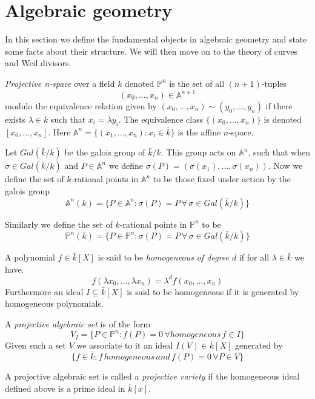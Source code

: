 
\section{Algebraic geometry}
In this section we define the fundamental objects in algebraic geometry and state
some facts about their structure. We will then move on to the theory of
curves and Weil divisors.

\begin{mydef}
\emph{Projective n-space} over a field $k$ denoted $\mathbb{P}^n$ is the set 
of all $(n+1)$-tuples $$(x_0,\ldots,x_n)\in\mathbb{A}^{n+1}$$
modulo the equivalence relation given by $(x_0,\ldots,x_n)\sim(y_0,\ldots,y_n)$ 
if there exists $\lambda\in k$ such that $x_i=\lambda y_i$.
The equivalence class $\{(x_0,\ldots,x_n)\}$ is denoted $[x_0,\ldots,x_n]$.
Here $\mathbb{A}^n = \{ (x_1,\ldots,x_n) : x_i \in \bar{k} \} $ is the affine $n$-space.
\end{mydef}

Let $Gal(\bar{k}/k)$ be the galois group of $\bar{k}/k$. This group acts on
$\mathbb{A}^n$, such that when $\sigma \in Gal(\bar{k}/k)$ and $P\in \mathbb{A}^n$
we define $\sigma(P) = (\sigma(x_1),\ldots,\sigma(x_n))$. Now we define
the set of $k$-rational points in $\mathbb{A}^n$ to be those fixed under action by
the galois group
$$ \mathbb{A}^n(k) = \{ P \in \mathbb{A}^n : \sigma(P) = P\, \forall\, \sigma \in
Gal(\bar{k}/k) \} $$

Similarly we define the set of $k$-rational points in $\mathbb{P}^n$ to be
$$ \mathbb{P}^n(k) = \{ P \in \mathbb{P}^n : \sigma(P) = P\, \forall\, \sigma \in 
Gal(\bar{k}/k) \} $$

\begin{mydef}
 A polynomial $f\in\bar{k}[X]$ is said to be \emph{homogeneous of degree $d$} if for all
$\lambda\in\bar{k}$ we have.
$$f(\lambda x_0,\ldots,\lambda x_n) = \lambda^d f(x_0,\ldots,x_n)$$
Furthermore an ideal $I\subseteq\bar{k}[X]$ is said to be homogeneous if it is generated
by homogeneous polynomials.
\end{mydef}

\begin{mydef}
 A \emph{projective algebraic set} is of the form
$$ V_I = \{ P\in \mathbb{P}^n : f(P) = 0\, \forall homogeneous\, f\in I \} $$
Given such a set $V$ we associate to it an ideal $I(V) \in \bar{k}[X]$ generated by
$$ \{f\in\bar{k} : f\, homogeneous\, and\, f(P)=0\, \forall P\in V \} $$
\end{mydef}

\begin{mydef}
 A projective algebraic set is called a \emph{projective variety} if the homogeneous
ideal defined above is a prime ideal in $\bar{k}[x]$.
\end{mydef}


